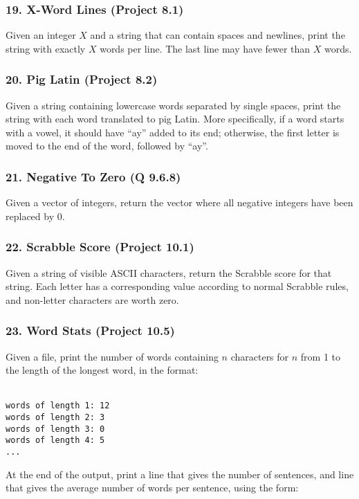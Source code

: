 \documentclass{sig-alternate}
\begin{document}
\subsubsection*{19. X-Word Lines (Project 8.1)}
Given an integer $X$  and a string that can contain spaces and newlines, print the string with exactly $X$ words per line. The last line may have fewer than $X$ words.

\subsubsection*{20. Pig Latin (Project 8.2)}
Given a string containing lowercase words separated by single spaces, print the string with each word translated to pig Latin. More specifically, if a word starts with a vowel, it should have ``ay'' added to its end; otherwise, the first letter is moved to the end of the word, followed by ``ay''.

\subsubsection*{21. Negative To Zero (Q 9.6.8)}
Given a vector of integers, return the vector where all negative integers have been replaced by 0.

\subsubsection*{22. Scrabble Score (Project 10.1)}
Given a string of visible ASCII characters, return the Scrabble score for that string. Each letter has a corresponding value according to normal Scrabble rules, and non-letter characters are worth zero.

\subsubsection*{23. Word Stats (Project 10.5)}
Given a file, print the number of words containing $n$ characters for $n$ from 1 to the length of the longest word, in the format:

\texttt{ \\
words of length 1: 12 \\
words of length 2: 3 \\
words of length 3: 0 \\
words of length 4: 5 \\
... \\
} %

\noindent At the end of the output, print a line that gives the number of sentences, and line that gives the average number of words per sentence, using the form:
\end{document}
